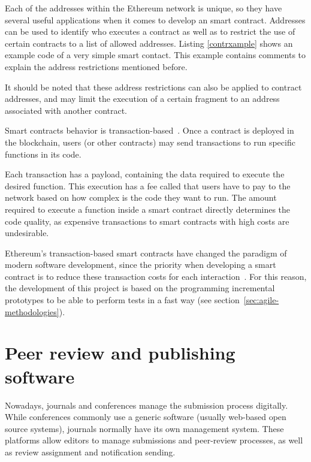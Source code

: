 Each of the addresses within the Ethereum network is unique, so they have
several useful applications when it comes to develop an smart contract.
Addresses can be used to identify who executes a contract as well as to restrict
the use of certain contracts to a list of allowed addresses. Listing
\ref{contrxample} shows an example code of a very simple smart contact. This
example contains comments to explain the address restrictions mentioned before.

It should be noted that these address restrictions can also be applied to
contract addresses, and may limit the execution of a certain fragment to an
address associated with another contract.

Smart contracts behavior is transaction-based~\cite{wood2014ethereum}. Once a
contract is deployed in the blockchain, users (or other contracts) may send
transactions to run specific functions in its code.



Each transaction has a payload, containing the data required to execute the
desired function. This execution has a fee called  that users have to
pay to the network based on how complex is the code they want to run. The
 amount required to execute a function inside a smart contract directly
determines the code quality, as expensive transactions to smart contracts with
high  costs are undesirable.

Ethereum's transaction-based smart contracts have changed the paradigm of modern
software development, since the priority when developing a smart contract is to
reduce these transaction costs for each interaction~\cite{delmolino2016step}.
For this reason, the development of this project is based on the programming
incremental prototypes to be able to perform tests in a fast way (see
section~\ref{sec:agile-methodologies}).


\section{Peer review and publishing software}
\label{sec:state-art}

Nowadays, journals and conferences manage the submission process digitally.
While conferences commonly use a generic software (usually web-based open source
systems), journals normally have its own management system. These platforms
allow editors to manage submissions and peer-review processes, as well as review
assignment and notification sending.

